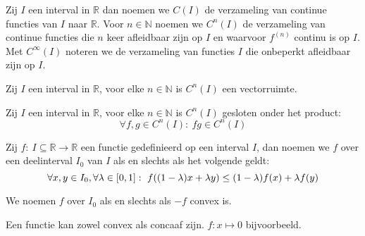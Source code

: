 \documentclass[main.tex]{subfiles}
\begin{document}
\begin{de}
  Zij $I$ een interval in $\mathbb{R}$ dan noemen we $C(I)$ de verzameling van continue functies van $I$ naar $\mathbb{R}$.
  Voor $n\in \mathbb{N}$ noemen we $C^{n}(I)$ de verzameling van continue functies die $n$ keer afleidbaar zijn op $I$ en waarvoor $f^{(n)}$ continu is op $I$.
  Met $C^{\infty}(I)$ noteren we de verzameling van functies $I$ die onbeperkt afleidbaar zijn op $I$.
\end{de}

\begin{st}
  Zij $I$ een interval in $\mathbb{R}$, voor elke $n\in \mathbb{N}$ is $C^{n}(I)$ een vectorruimte.
\end{st}

\begin{st}
  Zij $I$ een interval in $\mathbb{R}$, voor elke $n\in \mathbb{N}$ is $C^{n}(I)$ gesloten onder het product:
  \[ \forall f,g \in C^{n}(I):\ fg \in C^{n}(I) \]
\end{st}

\begin{de}
  \label{de:convexe-functie}
  Zij $f:\ I \subseteq \mathbb{R} \rightarrow \mathbb{R}$ een functie gedefinieerd op een interval $I$, dan noemen we $f$  over een deelinterval $I_{0}$ van $I$ als en slechts als het volgende geldt:
  \[ \forall x,y \in I_{0}, \forall \lambda \in \interval{0}{1}:\ f((1-\lambda)x+\lambda y) \le (1-\lambda)f(x) + \lambda f(y)\]
\end{de}
\begin{de}
  We noemen $f$  over $I_{0}$ als en slechts als $-f$ convex is.
\end{de}

\begin{opm}
  Een functie kan zowel convex als concaaf zijn.
  $f: x \mapsto 0$ bijvoorbeeld.
\end{opm}
\end{document}
